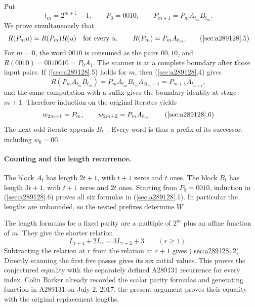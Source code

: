 \documentclass[11pt]{article}
\begin{document}
Put
\[
t_m=2^{m+1}-1,\qquad P_0=0010,\qquad
P_{m+1}=P_mA_{t_m}B_{t_m}.
\]
We prove simultaneously that
\[
R(P_mu)=R(P_m)R(u)\quad\hbox{for every }u,
\qquad R(P_m)=P_mA_{t_m}.
\tag{\ref{sec:a289128}.5}
\]
For $m=0$, the word $0010$ is consumed as the pairs $00,10$, and
$R(0010)=0010010=P_0A_1$. The scanner is at a complete boundary
after those input pairs. If (\ref{sec:a289128}.5) holds for $m$,
then (\ref{sec:a289128}.4) gives
\[
R(P_mA_{t_m}B_{t_m})
=P_mA_{t_m}B_{t_m}A_{2t_m+1}
=P_{m+1}A_{t_{m+1}},
\]
and the same computation with a suffix gives the boundary identity
at stage $m+1$. Therefore induction on the original iterates yields
\[
w_{2m+1}=P_m,\qquad w_{2m+2}=P_mA_{t_m}.
\tag{\ref{sec:a289128}.6}
\]
The next odd iterate appends $B_{t_m}$. Every word is thus a prefix
of its successor, including $w_0=00$.

\paragraph{Counting and the length recurrence.}
The block $A_t$ has length $2t+1$, with $t+1$ zeros and $t$ ones.
The block $B_t$ has length $3t+1$, with $t+1$ zeros and $2t$ ones.
Starting from $P_0=0010$, induction in
(\ref{sec:a289128}.6) proves all six formulas in
(\ref{sec:a289128}.1). In particular the lengths are unbounded,
so the nested prefixes determine $W$.

The length formulas for a fixed parity are a multiple of $2^m$
plus an affine function of $m$. They give the shorter relation
\[
L_{r+4}+2L_r=3L_{r+2}+3\qquad(r\ge1).
\]
Subtracting the relation at $r$ from the relation at $r+1$ gives
(\ref{sec:a289128}.2). Directly scanning the first five passes
gives its six initial values. This proves the conjectured equality
with the separately defined A289131 recurrence for every index.
Colin Barker already recorded the scalar parity formulas and
generating function in A289131 on July 2, 2017; the present argument
proves their equality with the original replacement lengths.
\end{document}
